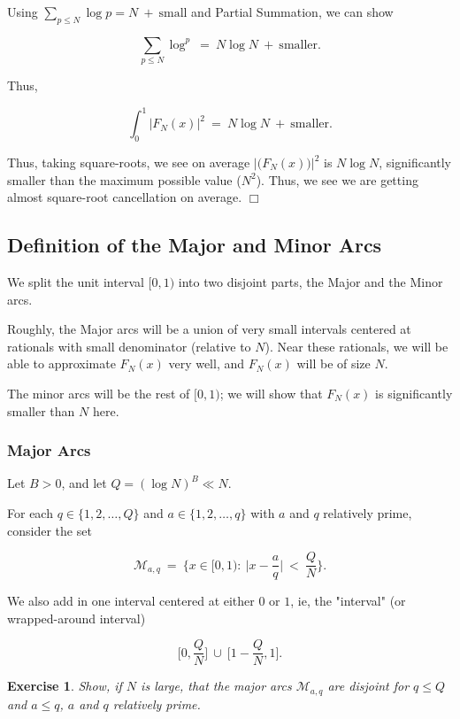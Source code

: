 \documentclass[12pt,letterpaper]{report}
\newcommand\be{\begin{equation}}
\newcommand\ee{\end{equation}}
\newtheorem{exe}[thm]{Exercise}
\begin{document}
Using $\sum_{p \le N} \log p = N \ + \ \text{small}$ and Partial
Summation, we can show

\be \sum_{p \le N} \log^p \ = \ N\log N \ + \ \text{smaller}. \ee

Thus,

\be \int_0^1 |F_N(x) |^2  \ =  \ N\log N \ + \ \text{smaller}. \ee

Thus, taking square-roots, we see on average $|\Big( F_N(x)
\Big)|^2$ is $N \log N$, significantly smaller than the maximum
possible value ($N^2$). Thus, we see we are getting almost
square-root cancellation on average. $\Box$

\subsection{Definition of the Major and Minor Arcs}

We split the unit interval $[0,1)$ into two disjoint parts, the
Major and the Minor arcs.

Roughly, the Major arcs will be a union of very small intervals
centered at rationals with small denominator (relative to $N$).
Near these rationals, we will be able to approximate $F_N(x)$ very
well, and $F_N(x)$ will be of size $N$.

The minor arcs will be the rest of $[0,1)$; we will show that
$F_N(x)$ is significantly smaller than $N$ here.

\subsubsection{Major Arcs}

Let $B > 0$, and let $Q = (\log N)^B \ll N$.

For each $q \in \{1,2,\dots,Q\}$ and $a \in \{1,2,\dots,q\}$ with
$a$ and $q$ relatively prime, consider the set

\be \mathcal{M}_{a,q} \ = \ \Big\{ x \in [0,1): \ \Big|x -
\frac{a}{q} \Big| \ < \ \frac{Q}{N} \Big\}. \ee

We also add in one interval centered at either $0$ or $1$, ie, the
"interval" (or wrapped-around interval)

\be \Bigg[0, \frac{Q}{N}\Bigg] \ \cup \ \Bigg[1 - \frac{Q}{N}, 1
\Bigg]. \ee

\begin{exe} Show, if $N$ is large, that the major arcs
$\mathcal{M}_{a,q}$ are disjoint for $q \le Q$ and $a \le q$, $a$
and $q$ relatively prime. \end{exe}
\end{document}
